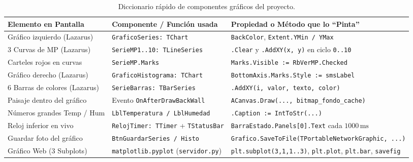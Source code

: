 \documentclass[11pt,a4paper]{article}
\begin{document}
\begin{table}[h!]
\centering
\small
\begin{tabular}{@{}lll@{}}
\toprule
\textbf{Elemento en Pantalla} & \textbf{Componente / Función usada} & \textbf{Propiedad o Método que lo ``Pinta''} \\ \midrule
Gráfico izquierdo (Lazarus) & \texttt{GraficoSeries: TChart} & \texttt{BackColor}, \texttt{Extent.YMin / YMax} \\
3 Curvas de MP (Lazarus) & \texttt{SerieMP1..10: TLineSeries} & \texttt{.Clear} y \texttt{.AddXY(x, y)} en ciclo \texttt{0..10} \\
Carteles rojos en curvas & \texttt{SerieMP.Marks} & \texttt{Marks.Visible := RbVerMP.Checked} \\
Gráfico derecho (Lazarus) & \texttt{GraficoHistograma: TChart} & \texttt{BottomAxis.Marks.Style := smsLabel} \\
6 Barras de colores (Lazarus) & \texttt{SerieBarras: TBarSeries} & \texttt{.AddXY(i, valor, texto, color)} \\
Paisaje dentro del gráfico & Evento \texttt{OnAfterDrawBackWall} & \texttt{ACanvas.Draw(..., bitmap\_fondo\_cache)} \\
Números grandes Temp / Hum & \texttt{LblTemperatura / LblHumedad} & \texttt{.Caption := IntToStr(...)} \\
Reloj inferior en vivo & \texttt{RelojTimer: TTimer} + \texttt{TStatusBar} & \texttt{BarraEstado.Panels[0].Text} cada $1000\,\text{ms}$ \\
Guardar foto del gráfico & \texttt{BtnGuardarSeries / Histo} & \texttt{Grafico.SaveToFile(TPortableNetworkGraphic, ...)} \\
Gráfico Web (3 Subplots) & \texttt{matplotlib.pyplot} (\texttt{servidor.py}) & \texttt{plt.subplot(3,1,1..3)}, \texttt{plt.plot}, \texttt{plt.bar}, \texttt{savefig} \\ \bottomrule
\end{tabular}
\caption{Diccionario rápido de componentes gráficos del proyecto.}
\end{table}
\end{document}
